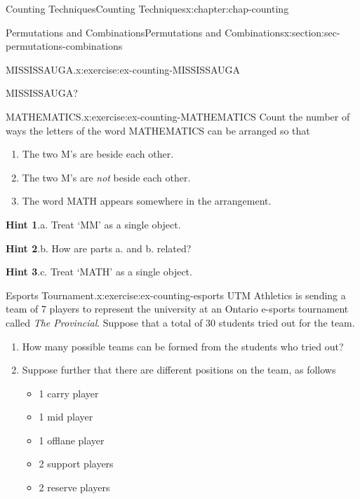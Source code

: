 \documentclass[oneside,10pt,]{book}
\newcommand{\blocktitlefont}{\relax}
\numberwithin{equation}{section}
\begin{document}
\begin{chapterptx}{Counting Techniques}{}{Counting Techniques}{}{}{x:chapter:chap-counting}
\begin{sectionptx}{Permutations and Combinations}{}{Permutations and Combinations}{}{}{x:section:sec-permutations-combinations}
\begin{inlineexercise}{MISSISSAUGA.}{x:exercise:ex-counting-MISSISSAUGA}
\begin{sidebyside}{1}{0.375}{0.375}{0}%
\begin{sbspanel}{0.25}%
MISSISSAUGA?%
\end{sbspanel}%
\end{sidebyside}%
\end{inlineexercise}%
\begin{inlineexercise}{MATHEMATICS.}{x:exercise:ex-counting-MATHEMATICS}%
Count the number of ways the letters of the word MATHEMATICS can be arranged so that%
\begin{enumerate}[label=(\alph*)]
\item{}The two M's are beside each other.%
\item{}The two M's are \emph{not} beside each other.%
\item{}The word MATH appears somewhere in the arrangement.%
\end{enumerate}
%
\par\smallskip%
\noindent\textbf{\blocktitlefont Hint 1}.\hypertarget{g:hint:id527014}{}\quad{}a. Treat `MM' as a single object.%
\par\smallskip%
\noindent\textbf{\blocktitlefont Hint 2}.\hypertarget{g:hint:id527006}{}\quad{}b. How are parts a. and b. related?%
\par\smallskip%
\noindent\textbf{\blocktitlefont Hint 3}.\hypertarget{g:hint:id527022}{}\quad{}c. Treat `MATH' as a single object.%
\end{inlineexercise}%
\begin{inlineexercise}{Esports Tournament.}{x:exercise:ex-counting-esports}%
UTM Athletics is sending a team of 7 players to represent the university at an Ontario e-sports tournament called \emph{The Provincial}. Suppose that a total of 30 students tried out for the team.%
\begin{enumerate}[label=(\alph*)]
\item{}How many possible teams can be formed from the students who tried out?%
\item{}Suppose further that there are different positions on the team, as follows%
\begin{itemize}[label=\textbullet]
\item{}1 carry player%
\item{}1 mid player%
\item{}1 offlane player%
\item{}2 support players%
\item{}2 reserve players%
\end{itemize}

\end{enumerate}
\end{inlineexercise}
\end{sectionptx}
\end{chapterptx}
\end{document}
